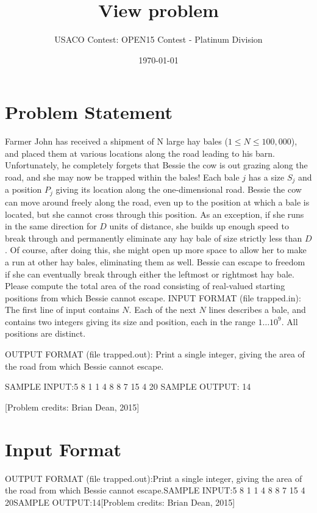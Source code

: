 \documentclass[12pt]{article}
\title{View problem}
\author{USACO Contest: OPEN15 Contest - Platinum Division}
\date{\today}
\begin{document}
\maketitle

\section*{Problem Statement}

Farmer John has received a shipment of N large hay bales ($1 \le N \le 100,000$),
and placed them at various locations along the road leading to his barn.
Unfortunately, he completely forgets that Bessie the cow is out grazing along
the road, and she may now be trapped within the bales!
Each bale $j$ has a size $S_j$ and a position $P_j$ giving its location along
the one-dimensional road.  Bessie the cow can move around freely along the road,
even up to the position at which a bale is located, but she cannot cross through
this position.  As an exception, if she runs in the same direction for $D$ units
of distance, she builds up enough speed to break through and permanently
eliminate any hay bale of size strictly less than $D$.  Of course, after
doing this, she might open up more space to allow her to make a run at other hay
bales, eliminating them as well.  
Bessie can escape to freedom if she can eventually break through either the 
leftmost or rightmost hay bale.  Please compute the total area of the road
consisting of real-valued starting positions from which Bessie cannot escape.
INPUT FORMAT (file trapped.in):
The first line of input contains $N$.  Each of the next $N$ lines describes a
bale, and contains two integers giving its size and position, each in the range
$1\ldots 10^9$. All positions are distinct.

OUTPUT FORMAT (file trapped.out):
Print a single integer, giving the area of the road from which Bessie cannot
escape.

SAMPLE INPUT:5
8 1
1 4
8 8
7 15
4 20
SAMPLE OUTPUT: 14

[Problem credits: Brian Dean, 2015]



\section*{Input Format}
OUTPUT FORMAT (file trapped.out):Print a single integer, giving the area of the road from which Bessie cannot
escape.SAMPLE INPUT:5
8 1
1 4
8 8
7 15
4 20SAMPLE OUTPUT:14[Problem credits: Brian Dean, 2015]
\end{document}

